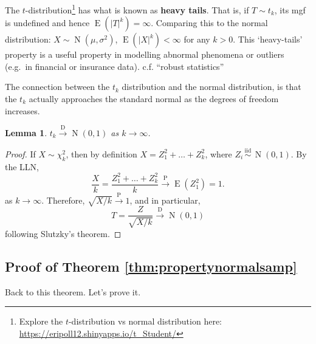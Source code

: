 \documentclass[
]{book}
\DeclareMathOperator{\E}{E}
\DeclareMathOperator{\N}{N}
\newcommand{\iid}{\,\overset{\text{iid}}{\sim}\,}
\newtheorem{lemma}{Lemma}[chapter]
\theoremstyle{definition}
\theoremstyle{definition}
\theoremstyle{definition}
\theoremstyle{definition}
\theoremstyle{remark}
\begin{document}
The \(t\)-distribution\footnote{Explore the \(t\)-distribution vs normal distribution here:
  \url{https://eripoll12.shinyapps.io/t_Student/}} has what is known as \textbf{heavy tails}.
That is, if \(T\sim t_k\), its mgf is undefined and hence \(\E(|T|^k) = \infty\).
Comparing this to the normal distribution:
\(X\sim\N(\mu,\sigma^2)\), \(\E(|X|^k) < \infty\) for any \(k>0\).
This `heavy-tails' property is a useful property in modelling
abnormal phenomena or outliers (e.g.~in financial or insurance data).
c.f. ``robust statistics''

The connection between the \(t_k\) distribution and the normal distribution, is that the \(t_k\) actually approaches the standard normal as the degrees of freedom increases.

\begin{lemma}
\(t_k \xrightarrow{\text{D}} \N(0,1)\) as \(k\to\infty\).
\end{lemma}

\begin{proof}
If \(X\sim\chi^2_k\), then by definition
\(X = Z_1^2 + \dots + Z_k^2\), where \(Z_i\iid\N(0,1)\). By the LLN,
\[\frac{X}{k} = \frac{Z_1^2 + \dots + Z_k^2}{k} \xrightarrow{\text{P}} \E(Z_1^2) = 1.\]
as \(k\to\infty\). Therefore, \(\sqrt{X/k} \xrightarrow{\text{P}} 1\), and
in particular,
\[T = \frac{Z}{\sqrt{X/k}} \xrightarrow{\text{D}} \N(0,1)\]
following Slutzky's theorem.
\end{proof}

\hypertarget{proof-of-theorem-refthmpropertynormalsamp}{%
\subsection{Proof of Theorem \ref{thm:propertynormalsamp}}\label{proof-of-theorem-refthmpropertynormalsamp}}

Back to this theorem. Let's prove it.
\end{document}
